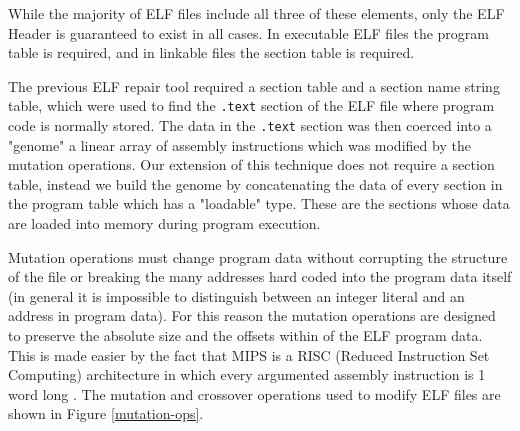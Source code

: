 \documentclass{sigcomm-alternate}
\begin{document}
While the majority of ELF files include all three of these elements,
only the ELF Header is guaranteed to exist in all cases.  In
executable ELF files the program table is required, and in linkable
files the section table is required.

The previous ELF repair tool required a section table and a section
name string table, which were used to find the \texttt{.text} section of the
ELF file where program code is normally stored.  The data in the
\texttt{.text} section was then coerced into a "genome" a linear array of
assembly instructions which was modified by the mutation operations.
Our extension of this technique does not require a section table,
instead we build the genome by concatenating the data of every section
in the program table which has a "loadable" type.  These are the
sections whose data are loaded into memory during program execution.

Mutation operations must change program data without corrupting the
structure of the file or breaking the many addresses hard coded into
the program data itself (in general it is impossible to distinguish
between an integer literal and an address in program data).  For this
reason the mutation operations are designed to preserve the absolute
size and the offsets within of the ELF program data.  This is made
easier by the fact that MIPS is a RISC (Reduced Instruction Set
Computing) architecture in which every argumented assembly instruction
is 1 word long \cite{hennessy1982mips}.  The mutation and crossover
operations used to modify ELF files are shown in Figure \ref{mutation-ops}.
\end{document}
